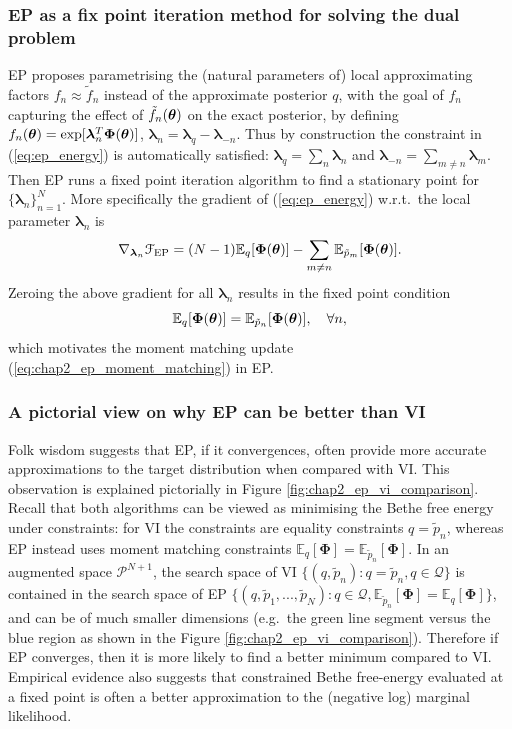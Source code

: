 \subsubsection{EP as a fix point iteration method for solving the dual problem}

EP \citep{minka:ep2001} proposes parametrising the (natural parameters of) local approximating factors $f_n \approx \tilde{f}_n$ instead of the approximate posterior $q$, with the goal of $f_n$ capturing the effect of $\tilde{f}_n(\bm{\theta})$ on the exact posterior, by defining $f_n(\bm{\theta}) = \exp [\bm{\lambda}_n^T \bm{\Phi}(\bm{\theta})]$, $\bm{\lambda}_n = \bm{\lambda}_q - \bm{\lambda}_{-n}$. Thus by construction the constraint in (\ref{eq:ep_energy}) is automatically satisfied: $\bm{\lambda}_q = \sum_n \bm{\lambda}_n$ and $\bm{\lambda}_{-n} = \sum_{m \neq n} \bm{\lambda}_m$.
%
Then EP runs a fixed point iteration algorithm to find a stationary point for $\{ \bm{\lambda}_n \}_{n=1}^N$. More specifically the gradient of (\ref{eq:ep_energy}) w.r.t.~the local parameter $\bm{\lambda}_n$ is 
\begin{equation}
\nabla_{\bm{\lambda}_n} \mathcal{F}_{\text{EP}} = (N-1) \mathbb{E}_{q} [ \bm{\Phi}(\bm{\theta}) ] - \sum_{m \neq n} \mathbb{E}_{\tilde{p}_m} [ \bm{\Phi}(\bm{\theta}) ].
\end{equation} 
Zeroing the above gradient for all $\bm{\lambda}_n$ results in the fixed point condition
$$\mathbb{E}_q[\bm{\Phi}(\bm{\theta})] = \mathbb{E}_{\tilde{p}_n}[ \bm{\Phi}(\bm{\theta}) ], \quad \forall n,$$
which motivates the moment matching update (\ref{eq:chap2_ep_moment_matching}) in EP.

\subsubsection{A pictorial view on why EP can be better than VI}
Folk wisdom suggests that EP, if it convergences, often provide more accurate approximations to the target distribution when compared with VI. This observation is explained pictorially in Figure \ref{fig:chap2_ep_vi_comparison}. 
%
Recall that both algorithms can be viewed as minimising the Bethe free energy under constraints: for VI the constraints are equality constraints $q = \tilde{p}_n$, whereas EP instead uses moment matching constraints $\mathbb{E}_q[\bm{\Phi}] = \mathbb{E}_{\tilde{p}_n}[\bm{\Phi}]$. In an augmented space $\mathcal{P}^{N+1}$, the search space of VI $\{ (q, \tilde{p}_n): q = \tilde{p}_n, q \in \mathcal{Q} \}$ is contained in the search space of EP $ \{ (q, \tilde{p}_1, ..., \tilde{p}_N): q \in \mathcal{Q}, \mathbb{E}_{\tilde{p}_n}[\bm{\Phi}] = \mathbb{E}_q[\bm{\Phi}] \}$, and can be of much smaller dimensions (e.g.~the green line segment versus the blue region as shown in the Figure \ref{fig:chap2_ep_vi_comparison}). Therefore if EP converges, then it is more likely to find a better minimum compared to VI. Empirical evidence also suggests that constrained Bethe free-energy evaluated at a fixed point is often a better approximation to the (negative log) marginal likelihood.

